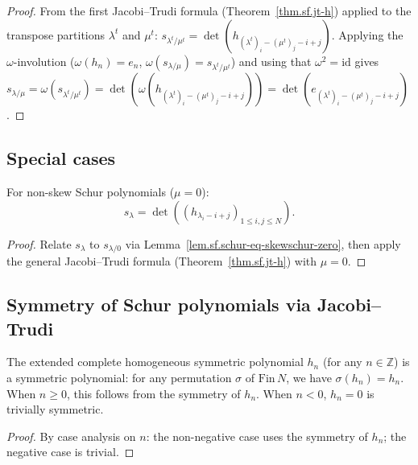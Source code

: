 \begin{proof}
From the first Jacobi--Trudi formula (Theorem~\ref{thm.sf.jt-h}) applied
to the transpose partitions $\lambda^t$ and $\mu^t$:
$s_{\lambda^t/\mu^t} = \det(h_{(\lambda^t)_i - (\mu^t)_j - i + j})$.
Applying the $\omega$-involution ($\omega(h_n) = e_n$,
$\omega(s_{\lambda/\mu}) = s_{\lambda^t/\mu^t}$)
and using that $\omega^2 = \mathrm{id}$ gives
$s_{\lambda/\mu} = \omega(s_{\lambda^t/\mu^t})
= \det(\omega(h_{(\lambda^t)_i - (\mu^t)_j - i + j}))
= \det(e_{(\lambda^t)_i - (\mu^t)_j - i + j})$.
\end{proof}

\subsection{Special cases}

\begin{theorem}
\label{thm.sf.jt-h-nonskew}
\leanhelper
\leanok
For non-skew Schur polynomials ($\mu = 0$):
\[
s_\lambda = \det\left( \left( h_{\lambda_i - i + j}
\right)_{1 \leq i,j \leq N} \right).
\]
\end{theorem}

\begin{proof}
Relate $s_\lambda$ to $s_{\lambda/0}$ via
Lemma~\ref{lem.sf.schur-eq-skewschur-zero}, then apply the general
Jacobi--Trudi formula (Theorem~\ref{thm.sf.jt-h}) with $\mu = 0$.
\end{proof}

\subsection{Symmetry of Schur polynomials via Jacobi--Trudi}

\begin{lemma}
\label{lem.sf.hsymm-ext-symmetric}
\leanhelper
\leanok
The extended complete homogeneous symmetric polynomial $h_n$ (for any
$n \in \mathbb{Z}$) is a symmetric polynomial: for any permutation
$\sigma$ of $\mathrm{Fin}\,N$, we have $\sigma(h_n) = h_n$.
When $n \geq 0$, this follows from the symmetry of $h_n$.
When $n < 0$, $h_n = 0$ is trivially symmetric.
\end{lemma}

\begin{proof}
By case analysis on $n$: the non-negative case uses the
symmetry of $h_n$; the negative case is trivial.
\end{proof}

